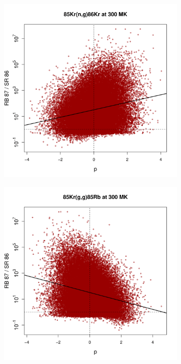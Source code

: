 \begin{figure}[t]
\begin{subfigure}[b]{0.495\textwidth}
\end{subfigure}
\begin{subfigure}[b]{0.495\textwidth}   
\centering 
\includegraphics[width=\textwidth]{Chapter-3/figs/CorrRB87SR86_85Kr_n_g_86Kr_300MK.png}
\end{subfigure}
\hfill
\begin{subfigure}[b]{0.495\textwidth}   
\centering 
\includegraphics[width=\textwidth]{Chapter-3/figs/CorrRB87SR86_85Kr_g_g_85Rb_300MK.png}

\end{subfigure}
\end{figure}
